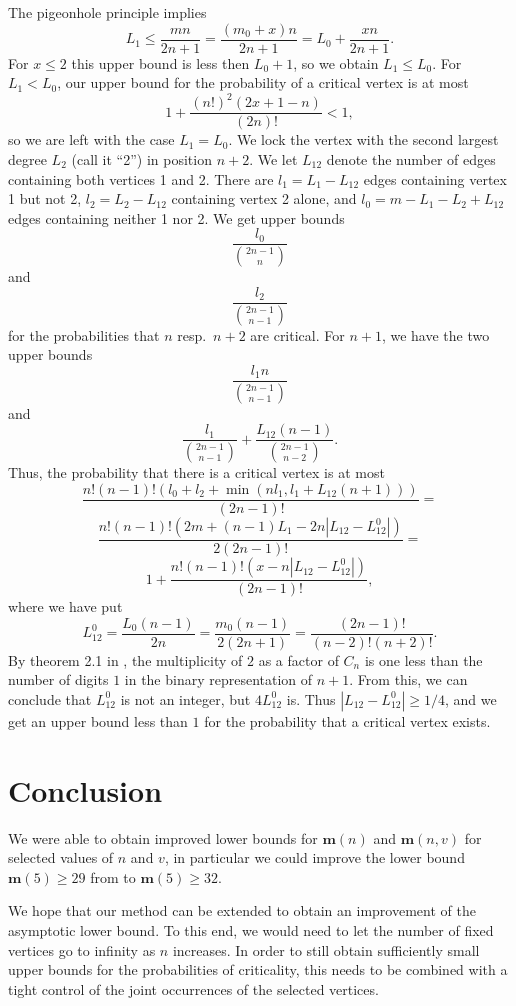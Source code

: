 \documentclass[a4paper,12pt]{article}
\begin{document}
The pigeonhole principle implies
\[L_1\le\frac{mn}{2n+1}=\frac{(m_0+x)n}{2n+1}=L_0+\frac{xn}{2n+1}.\]
For $x\le 2$ this upper bound is less then $L_0+1$, so we obtain
$L_1\le L_0$. For $L_1<L_0$, our upper bound for the probability
of a critical vertex is at most
\[1+ \frac{(n!)^2(2x+1-n)}{(2n)!}<1,\]
so we are left with the case $L_1=L_0$. We lock the vertex with the
second largest degree $L_2$ (call it ``2'')
in position $n+2$. We let $L_{12}$ denote
the number of edges containing both vertices 1 and 2.
There are $l_1=L_1-L_{12}$ edges containing vertex 1 but not 2,
$l_2=L_2-L_{12}$ containing vertex 2 alone, and $l_0=m-L_1-L_2+L_{12}$
edges containing neither 1 nor 2. We get upper bounds
\[\frac{l_0}{\genfrac (){0pt}1{2n-1}{n}}\]
and
\[\frac{l_2}{\genfrac (){0pt}1{2n-1}{n-1}}\]
for the probabilities that $n$ resp.\ $n+2$ are critical.
For $n+1$, we have the two upper bounds
\[\frac{l_1n}{\genfrac(){0pt}1{2n-1}{n-1}}\]
and
\[\frac{l_1}{\genfrac(){0pt}1{2n-1}{n-1}}+
\frac{L_{12}(n-1)}{\genfrac(){0pt}1{2n-1}{n-2}}.\]
Thus, the probability that there is a critical vertex is at most
\[\frac{n!(n-1)!(l_0+l_2+\min(nl_1, l_1+L_{12}(n+1)))}{(2n-1)!}=\]\[
\frac{n!(n-1)!(2m+(n-1)L_1-2n|L_{12}-L_{12}^{0}|)}{2(2n-1)!}=\]\[
1+\frac{n!(n-1)!(x-n|L_{12}-L_{12}^{0}|)}{(2n-1)!},\]
where we have put
\[L_{12}^{0}=\frac{L_0(n-1)}{2n}=\frac{m_0(n-1)}{2(2n+1)}=
\frac{(2n-1)!}{(n-2)!(n+2)!}.\]
By theorem 2.1 in \cite{deutschsagan}, the multiplicity of $2$ as a factor
of $C_n$ is one less than the number of digits $1$ in the binary representation
of $n+1$. From this, we can conclude that $L_{12}^0$ is not an integer, but
$4L_{12}^0$ is. Thus $|L_{12}-L_{12}^0|\ge 1/4$, and we get an upper bound
less than $1$ for the probability that a critical vertex exists.

\section{Conclusion}
We were able to obtain improved lower bounds for $\mathbf m(n)$ and $\mathbf m(n,v)$ for
selected values of $n$ and $v$, in particular we could improve the lower
bound $\mathbf m(5)\ge 29$ from \cite{shanni} to $\mathbf m(5)\ge 32$. 

We hope that our method can be extended to obtain an improvement of the
asymptotic lower bound. To this end, we would need to let the number of
fixed vertices go to infinity as $n$ increases. In order to still obtain
sufficiently small upper bounds for the probabilities of criticality,
this needs to be combined with a tight control of the joint occurrences of
the selected vertices.
\end{document}
